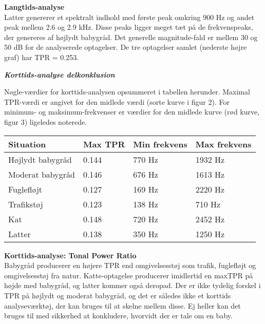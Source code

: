 
\newpage
\textbf{Langtids-analyse} \\
Latter genererer et spektralt indhold med første peak omkring 900 Hz og andet peak mellem 2.6 og 2.9 kHz. Disse peaks ligger meget tæt på de frekvenspeaks, der genereres af højlydt babygråd. Det generelle magnitude-fald er mellem 30 og 50 dB for de analyserede optagelser. De tre optagelser samlet (nederste højre graf) har TPR = 0.253.



\newpage
\begin{center} \textit{\textbf{Korttids-analyse delkonklusion}} \end{center}
Nøgle-værdier for korttids-analysen opsummeret i tabellen herunder. Maximal TPR-værdi er angivet for den midlede værdi (sorte kurve i figur 2). For minimum- og maksimum-frekvenser er værdier for den midlede kurve (rød kurve, figur 3) ligeledes noterede.

\begin{center}
    \begin{tabular}{ | l | l | l | l |}
    \hline
    \textbf{Situation} 	& \textbf{Max TPR}  &\textbf{Min frekvens}	&\textbf{Max frekvens}  	\\ \hline
    Højlydt babygråd 	& 0.144   				&770 Hz 				&1932 Hz				\\ \hline
    Moderat babygråd 	& 0.146  				&676 Hz 				&1613 Hz				\\ \hline
    Fuglefløjt 			& 0.127  				&169 Hz 				&2220 Hz				\\ \hline	
    Trafikstøj 			& 0.123  				&138 Hz 				&710 Hz					\\ \hline
    Kat 				& 0.148  				&720 Hz					&2452 Hz				\\ \hline
    Latter 				& 0.138  				&350 Hz					&1250 Hz				\\ \hline
    \end{tabular}
\end{center}

\textbf{Korttids-analyse: Tonal Power Ratio}	\\
Babygråd producerer en højere TPR end omgivelsesstøj som trafik, fuglefløjt og omgivelsesstøj fra natur. Katte-optagelse producerer imidlertid en maxTPR på højde med babygråd, og latter kommer også deropad. Der er ikke tydelig forskel i TPR på højlydt og moderat babygråd, og det er således ikke et korttids analyseværktøj, der kan bruges til at skelne mellem disse. Ej heller kan det bruges til med sikkerhed at konkludere, hvorvidt der er tale om en baby.

